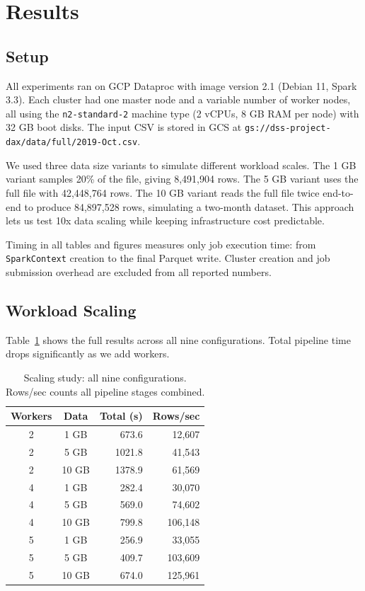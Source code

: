 \documentclass[letterpaper,twocolumn,10pt]{article}
\begin{document}
\section{Results}

\subsection{Setup}

All experiments ran on GCP Dataproc with image version 2.1 (Debian 11, Spark 3.3).
Each cluster had one master node and a variable number of worker nodes, all using
the \texttt{n2-standard-2} machine type (2 vCPUs, 8 GB RAM per node) with 32 GB
boot disks. The input CSV is stored in GCS at
\texttt{gs://dss-project-dax/data/full/2019-Oct.csv}.

We used three data size variants to simulate different workload scales. The 1 GB
variant samples 20\% of the file, giving 8,491,904 rows. The 5 GB variant uses the
full file with 42,448,764 rows. The 10 GB variant reads the full file twice
end-to-end to produce 84,897,528 rows, simulating a two-month dataset. This approach
lets us test 10x data scaling while keeping infrastructure cost predictable.

Timing in all tables and figures measures only job execution time: from
\texttt{SparkContext} creation to the final Parquet write. Cluster creation and
job submission overhead are excluded from all reported numbers.

\subsection{Workload Scaling}

Table~\ref{tab:scaling} shows the full results across all nine configurations. Total
pipeline time drops significantly as we add workers.

\begin{table}[H]
\centering
\small
\caption{Scaling study: all nine configurations. Rows/sec counts all pipeline stages combined.}
\label{tab:scaling}
\begin{tabular}{@{}ccrr@{}}
\toprule
Workers & Data & Total (s) & Rows/sec \\
\midrule
2  & 1 GB  &  673.6 & 12,607  \\
2  & 5 GB  & 1021.8 & 41,543  \\
2  & 10 GB & 1378.9 & 61,569  \\
4  & 1 GB  &  282.4 & 30,070  \\
4  & 5 GB  &  569.0 & 74,602  \\
4  & 10 GB &  799.8 & 106,148 \\
5  & 1 GB  &  256.9 & 33,055  \\
5  & 5 GB  &  409.7 & 103,609 \\
5  & 10 GB &  674.0 & 125,961 \\
\bottomrule
\end{tabular}
\end{table}
\end{document}
